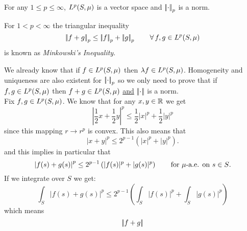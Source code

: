 \documentclass{article}
\begin{document}
\begin{theorem}
	For any $1\leq p\leq\infty$, $L^{p}(S,\mu)$ is a vector space and $\left|\negthinspace\left|\cdot\right|\negthinspace\right|_{p}$ is a norm.
\end{theorem}
\begin{remark}
	For $1<p<\infty$ the triangular inequality
	\begin{equation*}
		\left|\negthinspace\left|f+g\right|\negthinspace\right|_p\leq\left|\negthinspace\left|f\right|\negthinspace\right|_p+\left|\negthinspace\left|g\right|\negthinspace\right|_p\qquad\forall\, f,g\in L^{p}(S,\mu)
	\end{equation*}
	is known as \emph{Minkowski's Inequality}.
\end{remark}
\begin{fancyproof}
	We already know that if $f\in L^{p}(S,\mu)$ then $\lambda f\in L^{p}(S,\mu)$. Homogeneity and uniqueness are also existent for $\left|\negthinspace\left|\cdot\right|\negthinspace\right|_p$ so we only need to prove that if $f,g\in L^{p}(S,\mu)$ then $f+g\in L^{p}(S,\mu)$ \underline{and} $\left|\negthinspace\left|\cdot\right|\negthinspace\right|$ is a norm. \\
	Fix $f,g\in L^{p}(S,\mu)$. We know that for any $x,y\in\mathbb{R}$ we get
	\begin{equation*}
		\left|\frac{1}{2}x+\frac{1}{2}y\right|^{p}\leq\frac{1}{2}|x|^p+\frac{1}{2}|y|^{p}
	\end{equation*}
	since this mapping $r\to r^p$ is convex. This also means that
	\begin{equation*}
		\left|x+y\right|^p\leq2^{p-1}\left(|x|^{p}+|y|^{p}\right).
	\end{equation*}
	and this implies in particular that
	\begin{equation*}
		\left|f(s)+g(s)\right|^{p}\leq2^{p-1}\left(|f(s)|^{p}+|g(s)|^{p}\right)\qquad\text{for $\mu$-a.e. on $s\in S$}.
	\end{equation*}
	If we integrate over $S$ we get:
	\begin{equation*}
		\int_S\left|f(s)+g(s)\right|^{p}\leq2^{p-1}\left(\int_S|f(s)|^{p}+\int_S|g(s)|^{p}\right)
	\end{equation*}
	which means 
	\begin{equation*}
		\left|\negthinspace\left|f+g\right|\negthinspace\right|
	\end{equation*}
\end{fancyproof}
\end{document}
